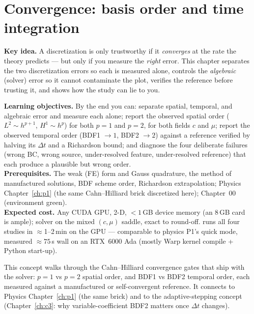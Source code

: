 \chapter{Convergence: basis order and time integration}
\label{ch:c1}
\begin{keybox}
\textbf{Key idea.} A discretization is only trustworthy if it
\emph{converges} at the rate the theory predicts --- but only if you
measure the \emph{right} error. This chapter separates the two
discretization errors so each is measured alone, controls the
\emph{algebraic} (solver) error so it cannot contaminate the plot,
verifies the reference before trusting it, and shows how the study can
lie to you.
\end{keybox}

\begin{keybox}
\textbf{Learning objectives.} By the end you can: separate spatial,
temporal, and algebraic error and measure each alone; report the
observed spatial order ($L^2\sim h^{p+1}$, $H^1\sim h^{p}$) for both
$p=1$ and $p=2$, for both fields $c$ and $\mu$; report the observed
temporal order (BDF1 $\to1$, BDF2 $\to2$) against a reference verified
by halving its $\Delta t$ and a Richardson bound; and diagnose the four
deliberate failures (wrong BC, wrong source, under-resolved feature,
under-resolved reference) that each produce a plausible but wrong
order.\\[2pt]
\textbf{Prerequisites.} The weak (FE) form and Gauss quadrature, the
method of manufactured solutions, BDF scheme order, Richardson
extrapolation; Physics Chapter~\ref{ch:p1} (the same Cahn--Hilliard
brick discretized here); Chapter~00 (environment green).\\[2pt]
\textbf{Expected cost.} Any CUDA GPU, 2-D, $<1$\,GB device memory (an
8\,GB card is ample); solver  on the mixed $(c,\mu)$ saddle,
exact to round-off.  runs all four studies in
$\approx$1--2\,min on the GPU --- comparable to physics P1's quick mode,
measured $\approx75$\,s wall on an RTX~6000 Ada (mostly Warp kernel
compile + Python start-up).
\end{keybox}

This concept walks through the Cahn--Hilliard convergence gates that
ship with the solver: $p=1$ vs $p=2$ spatial order, and BDF1 vs BDF2
temporal order, each measured against a manufactured or self-convergent
reference. It connects to Physics Chapter~\ref{ch:p1} (the same brick)
and to the adaptive-stepping concept (Chapter~\ref{ch:c3}: why
variable-coefficient BDF2 matters once $\Delta t$ changes).

